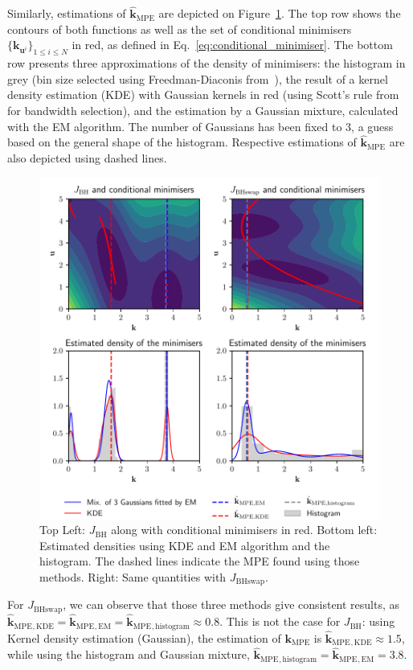 \documentclass[preprint, review, 1p]{elsarticle}
\newcommand{\kmpe}{{\mathbf{k}}_{\mathrm{MPE}}}
\newcommand{\hatkmpe}{\hat{\mathbf{k}}_{\mathrm{MPE}}}
\newcommand{\JBH}{J_{\mathrm{BH}}}
\newcommand{\JBHS}{J_{\mathrm{BHswap}}}
\newlength{\singlecolumnsize}
\begin{document}
Similarly, estimations of $\hatkmpe$ are depicted on Figure~\ref{fig:contours}. The top row shows the contours of both functions as well as the set of conditional minimisers $\{\mathbf{k}_{\mathbf{u}^i}\}_{1\leq i \leq N}$ in red, as defined in Eq.~\eqref{eq:conditional_minimiser}.
The bottom row presents three approximations of the density of minimisers: the histogram in grey (bin size selected using Freedman-Diaconis from~\cite{freedman_histogram_1981}), the result of a kernel density estimation (KDE) with Gaussian kernels in red (using Scott's rule from~\cite{scott_optimal_1979} for bandwidth selection), and the estimation by a Gaussian mixture, calculated with the EM algorithm. The number of Gaussians has been fixed to 3, a guess based on the general shape of the histogram. Respective estimations of $\hatkmpe$ are also depicted using dashed lines. 
\begin{figure}[!h]
  \centering
  \includegraphics[width=\singlecolumnsize]{Figures/FIG02.pdf}
  \caption{Top Left:  $\JBH$ along with conditional minimisers in red. Bottom left: Estimated densities using KDE and EM algorithm and the histogram. The dashed lines indicate the MPE found using those methods. Right: Same quantities with $\JBHS$.}
\label{fig:contours}
\end{figure}

For $\JBHS$, we can observe that those three methods give consistent results, as $\hatkmpe {}_{,\mathrm{KDE}} =\hatkmpe {}_{,\mathrm{EM}}=\hatkmpe {}_{,\mathrm{histogram}}\approx 0.8$. This is not the case for $\JBH$: using Kernel density estimation (Gaussian), the estimation of $\kmpe$ is $\hatkmpe {}_{,\mathrm{KDE}} \approx 1.5$, while using the histogram and Gaussian mixture, $\hatkmpe {}_{,\mathrm{histogram}}=\hatkmpe {}_{,\mathrm{EM}}=3.8$.
\end{document}
